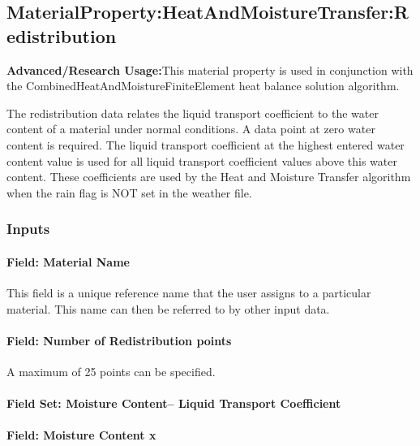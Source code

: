 \subsection{MaterialProperty:HeatAndMoistureTransfer:Redistribution}\label{materialpropertyheatandmoisturetransferredistribution}

\textbf{Advanced/Research Usage:}This material property is used in conjunction with the CombinedHeatAndMoistureFiniteElement heat balance solution algorithm.

The redistribution data relates the liquid transport coefficient to the water content of a material under normal conditions. A data point at zero water content is required. The liquid transport coefficient at the highest entered water content value is used for all liquid transport coefficient values above this water content. These coefficients are used by the Heat and Moisture Transfer algorithm when the rain flag is NOT set in the weather file.

\subsubsection{Inputs}\label{inputs-10-020}

\paragraph{Field: Material Name}\label{field-material-name-3}

This field is a unique reference name that the user assigns to a particular material. This name can then be referred to by other input data.

\paragraph{Field: Number of Redistribution points}\label{field-number-of-redistribution-points}

A maximum of 25 points can be specified.

\paragraph{Field Set: Moisture Content-- Liquid Transport Coefficient}\label{field-set-moisture-content-liquid-transport-coefficient-1}

\paragraph{Field: Moisture Content x}\label{field-moisture-content-x-2}

